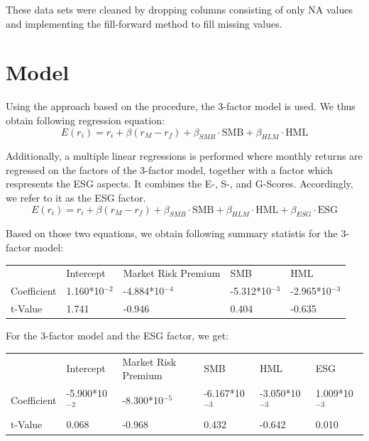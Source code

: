 \documentclass[12pt, a4paper]{article}%
\begin{document}
These data sets were cleaned by dropping columns consisting of only NA values and implementing the fill-forward method to fill missing values.

\section{Model}
Using the approach based on the \textcite{FamaFrench1992} procedure, the 3-factor model is used. We thus obtain following regression equation:\\
\begin{equation} 
E(r_i) = r_i + \beta(r_M-r_f) + \beta_{SMB} \cdot\text{SMB} +  \beta_{HLM} \cdot\text{HML}
 \end{equation}

Additionally, a multiple linear regressions is performed where monthly returns are regressed on the factors of the 3-factor model, together with a factor which respresents the ESG aspects. It combines the E-, S-, and G-Scores. Accordingly, we refer to it as the ESG factor.\\
\begin{equation}
E(r_i) = r_i + \beta(r_M-r_f) + \beta_{SMB} \cdot\text{SMB} +  \beta_{HLM} \cdot\text{HML} +  \beta_{ESG}\cdot\text{ESG}
\end{equation}

Based on those two equations, we obtain following summary statistis for the 3-factor model:
\begin{table}[]
    \begin{tabular}{l|llll}
                & Intercept                      & Market Risk Premium             & SMB                             & HML                             \\
    Coefficient & 1.160*10$^{-2}$ & -4.884*10$^{-4}$ & -5.312*10$^{-3}$ & -2.965*10$^{-3}$ \\
    t-Value     & 1.741                          & -0.946                          & 0.404                           & -0.635                         
    \end{tabular}
    \end{table}

For the 3-factor model and the ESG factor, we get: \\
\begin{table}[]
    \begin{tabular}{llllll}
                & Intercept                       & Market Risk Premium             & SMB                             & HML                             & ESG                            \\
    Coefficient & -5.900*10$^{-2}$ & -8.300*10$^{-5}$ & -6.167*10$^{-3}$ & -3.050*10$^{-3}$ & 1.009*10$^{-3}$ \\
    t-Value     & 0.068                           & -0.968                          & 0.432                           & -0.642                          & 0.010                         
    \end{tabular}
    \end{table}
\end{document}
